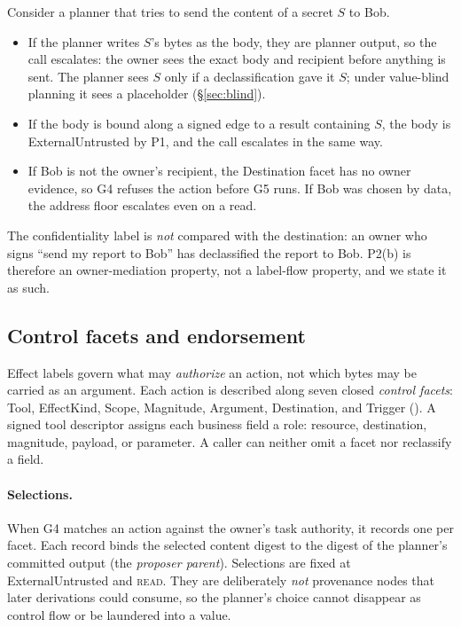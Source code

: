 \documentclass[letterpaper,twocolumn,10pt]{article}
\newcommand{\code}[1]{\texttt{\detokenize{#1}}}
\newcommand{\READ}{\textsc{read}}
\begin{document}
Consider a planner that tries to send the content of a secret $S$ to Bob.
\begin{itemize}
\item If the planner writes $S$'s bytes as the body, they are planner
  output, so the call escalates: the owner sees the exact body and
  recipient before anything is sent. The planner sees $S$ only if a
  declassification gave it $S$; under value-blind planning it sees a
  placeholder (\S\ref{sec:blind}).
\item If the body is bound along a signed edge to a result containing $S$,
  the body is \textsf{ExternalUntrusted} by P1, and the call escalates in
  the same way.
\item If Bob is not the owner's recipient, the \textsf{Destination} facet
  has no owner evidence, so G4 refuses the action before G5 runs. If Bob
  was chosen by data, the address floor escalates even on a read.
\end{itemize}
The confidentiality label is \emph{not} compared with the destination: an
owner who signs ``send my report to Bob'' has declassified the report to
Bob. P2(b) is therefore an owner-mediation property, not a label-flow
property, and we state it as such.

\subsection{Control facets and endorsement}
\label{sec:endorsement}

Effect labels govern what may \emph{authorize} an action, not which bytes
may be carried as an argument. Each action is described along seven closed
\emph{control facets}: \textsf{Tool}, \textsf{EffectKind}, \textsf{Scope},
\textsf{Magnitude}, \textsf{Argument}, \textsf{Destination}, and
\textsf{Trigger} (\code{ControlFacetV2}). A signed tool descriptor assigns
each business field a role: resource, destination, magnitude, payload, or
parameter. A caller can neither omit a facet nor reclassify a field.

\paragraph{Selections.} When G4 matches an action against the owner's task
authority, it records one \code{ControlSelectionV2} per facet. Each record
binds the selected content digest to the digest of the planner's committed
output (the \emph{proposer parent}). Selections are fixed at
\textsf{ExternalUntrusted} and \READ{}. They are deliberately \emph{not}
provenance nodes that later derivations could consume, so the planner's
choice cannot disappear as control flow or be laundered into a value.
\end{document}
